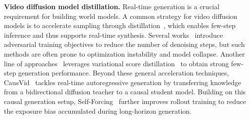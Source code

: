 \noindent\textbf{Video diffusion model distillation.}
Real-time generation is a crucial requirement for building world models.
A common strategy for video diffusion models is to accelerate sampling through distillation~\cite{salimans2022progressive, geng2025mean, frans2024one}, which enables few-step inference and thus supports real-time synthesis.
Several works~\cite{sauer2024fast, sauer2024adversarial, kang2024distilling, lin2025diffusion, lin2024sdxl, lin2025autoregressive} introduce adversarial training objectives to reduce the number of denoising steps, but such methods are often prone to optimization instability and model collapse.
Another line of approaches~\cite{yin2024one, yin2024improved, lu2025adversarial} leverages variational score distillation~\cite{wang2023prolificdreamer} to obtain strong few-step generation performance.
Beyond these general acceleration techniques, CausVid~\cite{yin2025slow} tackles real-time autoregressive generation by transferring knowledge from a bidirectional diffusion teacher to a causal student model.
Building on this causal generation setup, Self-Forcing~\cite{huang2025self} further improves rollout training to reduce the exposure bias accumulated during long-horizon generation.

